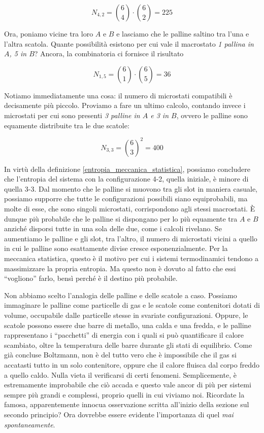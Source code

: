 \[ N_{4,2} = \binom{6}{4} \cdot \binom{6}{2} = 225 \]

Ora, poniamo vicine tra loro $A$ e $B$ e lasciamo che le palline
saltino tra l'una e l'altra scatola. Quante possibilità esistono
per cui vale il macrostato \textit{1 pallina in $A$, 5 in $B$}?
Ancora, la combinatoria ci fornisce il risultato

\[ N_{1,5} = \binom{6}{1} \cdot \binom{6}{5} = 36 \]

\noindent Notiamo immediatamente una cosa: il numero di microstati
compatibili è decisamente più piccolo. Proviamo a fare un ultimo
calcolo, contando invece i microstati per cui sono presenti
\textit{3 palline in $A$ e 3 in $B$}, ovvero le palline sono
equamente distribuite tra le due scatole:

\[ N_{3,3} =\binom{6}{3}^2 = 400 \]

In virtù della definizione \ref{entropia_meccanica_statistica}, possiamo concludere che
l'entropia del sistema con la configurazione 4-2, quella iniziale,
è minore di quella 3-3.
Dal momento che le palline si muovono tra gli slot in maniera
casuale, possiamo supporre che tutte le configurazioni possibili
siano equiprobabili, ma molte di esse, che sono singoli microstati,
corrispondono agli stessi macrostati. È dunque più probabile che
le palline si dispongano per lo più equamente tra $A$ e $B$
anziché disporsi tutte in una sola delle due, come i calcoli
rivelano. Se aumentiamo
le palline e gli slot, tra l'altro, il numero di microstati
vicini a quello in cui le palline sono esattamente divise
cresce esponenzialmente. Per la meccanica statistica, questo
è il motivo per cui i sistemi termodinamici tendono a massimizzare
la propria entropia. Ma questo non è dovuto al fatto che essi
``vogliono'' farlo, bensì perché è il destino più probabile.

Non abbiamo scelto l'analogia delle palline e delle scatole a caso.
Possiamo immaginare le palline come particelle di gas e le scatole
come contenitori dotati di volume, occupabile dalle particelle stesse
in svariate configurazioni. Oppure, le scatole possono essere
due barre di metallo, una calda e una fredda, e le palline
rappresentano i ``pacchetti'' di energia con i quali si può
quantificare il calore scambiato, oltre la temperatura delle barre durante
gli stati di equilibrio. Come già concluse Boltzmann, non è
del tutto vero che è impossibile che il gas si accatasti
tutto in un solo contenitore, oppure che il calore fluisca
dal corpo freddo a quello caldo. Nulla vieta il verificarsi di
certi fenomeni. Semplicemente, è estremamente
improbabile che ciò accada e questo vale ancor di più per sistemi
sempre più grandi e complessi, proprio quelli in cui viviamo noi.
Ricordate la famosa, apparentemente innocua osservazione scritta
all'inizio della sezione sul secondo principio? Ora dovrebbe essere
evidente l'importanza di quel \emph{mai spontaneamente}.

